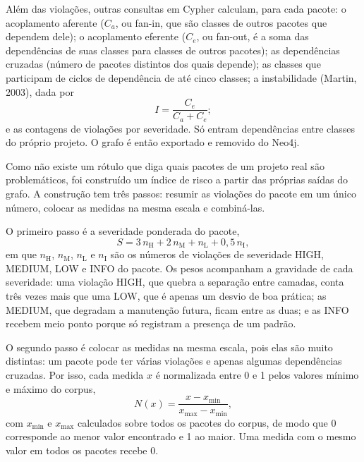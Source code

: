 \documentclass[
  a4paper,
]{article}
\begin{document}
Além das violações, outras consultas em Cypher calculam, para cada pacote: o acoplamento aferente ($C_a$, ou fan-in, que são classes de outros pacotes que dependem dele); o acoplamento eferente ($C_e$, ou fan-out, é a soma das dependências de suas classes para classes de outros pacotes); as dependências cruzadas (número de pacotes distintos dos quais depende); as classes que participam de ciclos de dependência de até cinco classes; a instabilidade (Martin, 2003), dada por
\begin{equation}
  I = \frac{C_e}{C_a + C_e};
  \label{eq:instabilidade}
\end{equation}
e as contagens de violações por severidade. Só entram dependências entre classes do próprio projeto. O grafo é então exportado e removido do Neo4j.

Como não existe um rótulo que diga quais pacotes de um projeto real são problemáticos, foi construído um índice de risco a partir das próprias saídas do grafo. A construção tem três passos: resumir as violações do pacote em um único número, colocar as medidas na mesma escala e combiná-las.

O primeiro passo é a severidade ponderada do pacote,
\begin{equation}
  S = 3\,n_{\mathrm{H}} + 2\,n_{\mathrm{M}} + n_{\mathrm{L}} + 0{,}5\,n_{\mathrm{I}},
  \label{eq:severidade}
\end{equation}
em que $n_{\mathrm{H}}$, $n_{\mathrm{M}}$, $n_{\mathrm{L}}$ e $n_{\mathrm{I}}$ são os números de violações de severidade HIGH, MEDIUM, LOW e INFO do pacote. Os pesos acompanham a gravidade de cada severidade: uma violação HIGH, que quebra a separação entre camadas, conta três vezes mais que uma LOW, que é apenas um desvio de boa prática; as MEDIUM, que degradam a manutenção futura, ficam entre as duas; e as INFO recebem meio ponto porque só registram a presença de um padrão.

O segundo passo é colocar as medidas na mesma escala, pois elas são muito distintas: um pacote pode ter várias violações e apenas algumas dependências cruzadas. Por isso, cada medida $x$ é normalizada entre 0 e 1 pelos valores mínimo e máximo do corpus,
\begin{equation}
  N(x) = \frac{x - x_{\min}}{x_{\max} - x_{\min}},
  \label{eq:normalizacao}
\end{equation}
com $x_{\min}$ e $x_{\max}$ calculados sobre todos os pacotes do corpus, de modo que 0 corresponde ao menor valor encontrado e 1 ao maior. Uma medida com o mesmo valor em todos os pacotes recebe 0.
\end{document}
